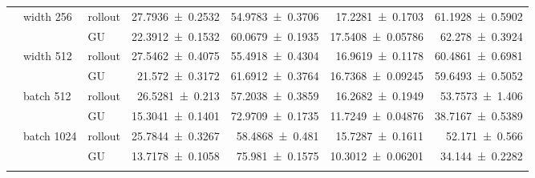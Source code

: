 {\begin{longtable}{@{}lllrrrr@{}}
    \addlinespace[2pt]
     & width 256 & rollout & \num{27.7936+-0.2532} & \num{54.9783+-0.3706} & \num{17.2281+-0.1703} & \num{61.1928+-0.5902} \\
     &  & GU & \num{22.3912+-0.1532} & \num{60.0679+-0.1935} & \num{17.5408+-0.05786} & \num{62.278+-0.3924} \\
    \addlinespace[2pt]
     & width 512 & rollout & \num{27.5462+-0.4075} & \num{55.4918+-0.4304} & \num{16.9619+-0.1178} & \num{60.4861+-0.6981} \\
     &  & GU & \num{21.572+-0.3172} & \num{61.6912+-0.3764} & \num{16.7368+-0.09245} & \num{59.6493+-0.5052} \\
    \addlinespace[2pt]
     & batch 512 & rollout & \num{26.5281+-0.213} & \num{57.2038+-0.3859} & \num{16.2682+-0.1949} & \num{53.7573+-1.406} \\
     &  & GU & \num{15.3041+-0.1401} & \num{72.9709+-0.1735} & \num{11.7249+-0.04876} & \num{38.7167+-0.5389} \\
    \addlinespace[2pt]
     & batch 1024 & rollout & \num{25.7844+-0.3267} & \num{58.4868+-0.481} & \num{15.7287+-0.1611} & \num{52.171+-0.566} \\
     &  & GU & \num{13.7178+-0.1058} & \num{75.981+-0.1575} & \num{10.3012+-0.06201} & \num{34.144+-0.2282} \\
    \addlinespace[2pt]
  \end{longtable}
}


